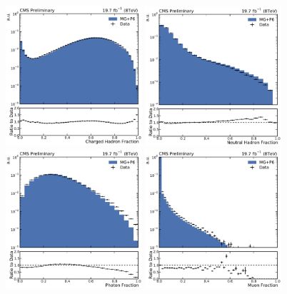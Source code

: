 \begin{figure}[htbp]
    \centering
    \includegraphics[width=0.45\textwidth]{figures/measurement/jetprop_chf_default.pdf}\hfill
    \includegraphics[width=0.45\textwidth]{figures/measurement/jetprop_nhf_default.pdf}
    \includegraphics[width=0.45\textwidth]{figures/measurement/jetprop_gammaf_default.pdf}\hfill
    \includegraphics[width=0.45\textwidth]{figures/measurement/jetprop_muf_default.pdf}

\end{figure}
